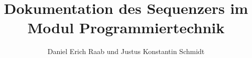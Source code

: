 \documentclass[12pt, a4paper, german]{article}
\title{Dokumentation des Sequenzers im Modul Programmiertechnik}
\author{Daniel Erich Raab und Justus Konstantin Schmidt}
\begin{document}
\def\startlcdtable{
	\begin{figure}[h]
	\ttfamily
	\centering
	\setlength{\tabcolsep}{2pt} %
	\begin{tabular}{|cccccccccccccccc|}
	\hline
}
\def\endlcdtable#1#2{
	\hline
	\end{tabular}
	\normalfont
	\caption{#1}
	\label{#2}
	\end{figure}
}

\newcommand{\lcdtext}[1] {\texttt{\framebox[1.1\width]{#1}}}

\newcommand{\source}[1] {\texttt{#1}}

\newcommand{\xydiagram}[3]{
	\begin{figure}[h]
	\centering
	\[
	\begin{xy}
	\xymatrix {
		#1
	}
	\end{xy}
	\]
	\caption{#2}
	\label{#3}
	\end{figure}
}

\maketitle
\tableofcontents




\end{document}
